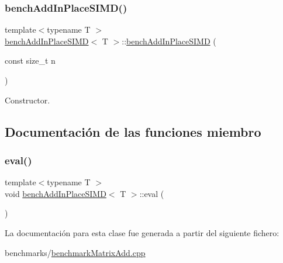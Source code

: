 \subsubsection{\texorpdfstring{bench\+Add\+In\+Place\+S\+I\+M\+D()}{benchAddInPlaceSIMD()}}
{\footnotesize\ttfamily template$<$typename T $>$ \\
\hyperlink{classbenchAddInPlaceSIMD}{bench\+Add\+In\+Place\+S\+I\+MD}$<$ T $>$\+::\hyperlink{classbenchAddInPlaceSIMD}{bench\+Add\+In\+Place\+S\+I\+MD} (\begin{DoxyParamCaption}\item[{const size\+\_\+t}]{n }\end{DoxyParamCaption})\hspace{0.3cm}{\ttfamily [inline]}}



Constructor. 



\subsection{Documentación de las funciones miembro}
\mbox{\label{classbenchAddInPlaceSIMD_aa04d03bcde9283288002bf6045e052f8}} 
\subsubsection{\texorpdfstring{eval()}{eval()}}
{\footnotesize\ttfamily template$<$typename T $>$ \\
void \hyperlink{classbenchAddInPlaceSIMD}{bench\+Add\+In\+Place\+S\+I\+MD}$<$ T $>$\+::eval (\begin{DoxyParamCaption}{ }\end{DoxyParamCaption})\hspace{0.3cm}{\ttfamily [inline]}}



La documentación para esta clase fue generada a partir del siguiente fichero\+:\begin{DoxyCompactItemize}
\item 
benchmarks/\hyperlink{benchmarkMatrixAdd_8cpp}{benchmark\+Matrix\+Add.\+cpp}\end{DoxyCompactItemize}
